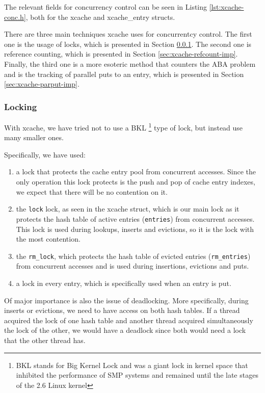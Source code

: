 The relevant fields for concurrency control can be seen in Listing 
\ref{lst:xcache-conc.h}, both for the xcache and xcache\_entry structs.


There are three main techniques xcache uses for concurrentcy control. The first 
one is the usage of locks, which is presented in Section 
\ref{sec:xcache-lock-imp}.  The second one is reference counting, which is 
presented in Section \ref{sec:xcache-refcount-imp}. Finally, the third one is a 
more esoteric method that counters the ABA problem and is the tracking of 
parallel puts to an entry, which is presented in Section 
\ref{sec:xcache-parput-imp}.

\subsubsection{Locking}\label{sec:xcache-lock-imp}

With xcache, we have tried not to use a BKL
\footnote{BKL stands for Big Kernel Lock and was a giant lock in kernel space 
	that inhibited the performance of SMP systems and remained until the 
	late stages of the 2.6 Linux kernel}
type of lock, but instead use many smaller ones.

Specifically, we have used:
\begin{enumerate}
	\item a lock that protects the cache entry pool from concurrent 
		accesses. Since the only operation this lock protects is the 
		push and pop of cache entry indexes, we expect that there will 
		be no contention on it.
	\item the \texttt{lock} lock, as seen in the xcache struct, which is 
		our main lock as it protects the hash table of active entries 
		(\texttt{entries}) from concurrent accesses. This lock is used 
		during lookups, inserts and evictions, so it is the lock with 
		the most contention.
	\item the \texttt{rm\_lock}, which protects the hash table of evicted 
		entries (\texttt{rm\_entries}) from concurrent accesses and is 
		used during insertions, evictions and puts.
	\item a lock in every entry, which is specifically used when an entry 
		is put.
\end{enumerate}

Of major importance is also the issue of deadlocking. More specifically, during 
inserts or evictions, we need to have access on both hash tables. If a thread 
acquired the lock of one hash table and another thread acquired simultaneously 
the lock of the other, we would have a deadlock since both would need a lock 
that the other thread has.

